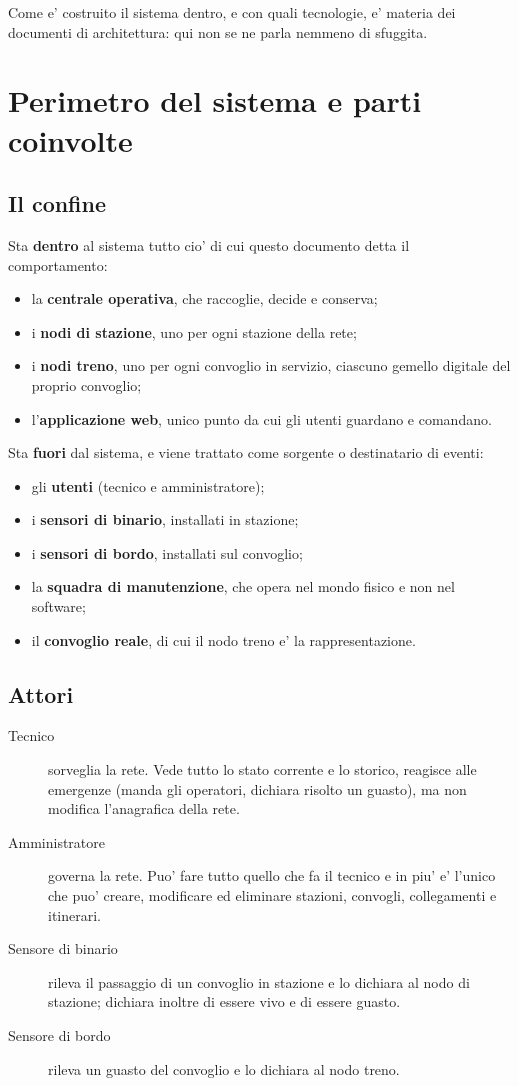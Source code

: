 \documentclass[11pt]{article}
\begin{document}
Come e' costruito il sistema dentro, e con quali tecnologie, e' materia dei documenti di
architettura: qui non se ne parla nemmeno di sfuggita.
\section{Perimetro del sistema e parti coinvolte}
\label{sec:org30d4696}

\subsection{Il confine}
\label{sec:orgf74963f}

Sta \textbf{dentro} al sistema tutto cio' di cui questo documento detta il comportamento:

\begin{itemize}
\item la \textbf{centrale operativa}, che raccoglie, decide e conserva;
\item i \textbf{nodi di stazione}, uno per ogni stazione della rete;
\item i \textbf{nodi treno}, uno per ogni convoglio in servizio, ciascuno gemello digitale del proprio
convoglio;
\item l'\textbf{applicazione web}, unico punto da cui gli utenti guardano e comandano.
\end{itemize}

Sta \textbf{fuori} dal sistema, e viene trattato come sorgente o destinatario di eventi:

\begin{itemize}
\item gli \textbf{utenti} (tecnico e amministratore);
\item i \textbf{sensori di binario}, installati in stazione;
\item i \textbf{sensori di bordo}, installati sul convoglio;
\item la \textbf{squadra di manutenzione}, che opera nel mondo fisico e non nel software;
\item il \textbf{convoglio reale}, di cui il nodo treno e' la rappresentazione.
\end{itemize}
\subsection{Attori}
\label{sec:org8786ad0}

\begin{description}
\item[{Tecnico}] sorveglia la rete. Vede tutto lo stato corrente e lo storico, reagisce alle emergenze
(manda gli operatori, dichiara risolto un guasto), ma non modifica l'anagrafica della rete.
\item[{Amministratore}] governa la rete. Puo' fare tutto quello che fa il tecnico e in piu' e' l'unico
che puo' creare, modificare ed eliminare stazioni, convogli, collegamenti e itinerari.
\item[{Sensore di binario}] rileva il passaggio di un convoglio in stazione e lo dichiara al nodo di
stazione; dichiara inoltre di essere vivo e di essere guasto.
\item[{Sensore di bordo}] rileva un guasto del convoglio e lo dichiara al nodo treno.
\end{description}
\end{document}
